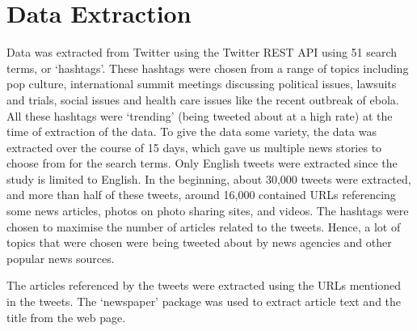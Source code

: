 \chapter{Data Extraction}

Data was extracted from Twitter using the Twitter REST API using 51 search terms, or ‘hashtags’. These hashtags were chosen from a range of topics including pop culture,  international summit meetings discussing political issues, lawsuits and trials, social issues and health care issues like the recent outbreak of ebola. All these hashtags were ‘trending’ (being tweeted about at a high rate) at the time of extraction of the data. To give the data some variety, the data was extracted over the course of 15 days, which gave us multiple news stories to choose from for the search terms. Only English tweets were extracted since the study is limited to English. In the beginning, about 30,000 tweets were extracted, and more than half of these tweets, around 16,000 contained URLs referencing some news articles, photos on photo sharing sites, and videos. The hashtags were chosen to maximise the number of articles related to the tweets. Hence, a lot of topics that were chosen were being tweeted about by news agencies and other popular news sources.

The articles referenced by the tweets were extracted using the URLs mentioned in the tweets. The ‘newspaper’ package was used to extract article text and the title from the web page.